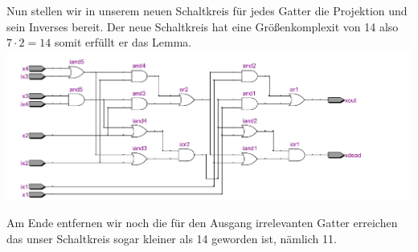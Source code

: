 \documentclass[a4paper]{article}
\begin{document}
Nun stellen wir in unserem neuen Schaltkreis f\"ur jedes Gatter
die Projektion und sein Inverses bereit. Der neue Schaltkreis hat eine Gr\"o\ss{}enkomplexit von 14 also $7 \cdot 2 = 14$ somit erf\"ullt er das Lemma. \\




\includegraphics[scale=0.50]{images/zwisk.pdf}

Am Ende entfernen wir noch die f\"ur den Ausgang irrelevanten Gatter erreichen das unser Schaltkreis sogar kleiner
als 14 geworden ist, n\"amlich 11.\\


\end{document}
